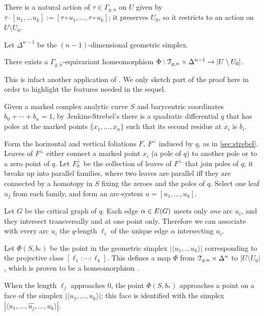 There is a natural action of $\tau \in \Gamma_{g,n}$ on $U$ given by $\tau \cdot [u_1, \ldots
u_k] := [\tau \circ u_1, \ldots, \tau \circ u_k]$; it preserves $U_0$, so it restricts to
an action on $U \setminus U_0$.

Let $\Delta^{n-1}$ be the $(n-1)$-dimensional geometric simplex.
\begin{theorem}
  \label{thm:H}
  There exists a $\Gamma_{g,n}$-equivariant homeomorphism $\Phi: \mathcal{T}_{g,n} \times
  \Delta^{n-1} \to |U \setminus U_0|$.
\end{theorem}
This is infact another application of .  We only sketch
part of the proof here in order to highlight the features needed in the
sequel. 

Given a marked complex analytic curve $S$ and barycentric coordinates
$b_0 + \cdots + b_n = 1$, by Jenkins-Strebel's  there is a
quadratic differential $q$ that has poles at the marked points $\{ x_1,
\ldots, x_n \}$ such that its second residue at $x_i$ is $b_i$.

Form the horizontal and vertical foliations $F$, $F^\perp$ induced by $q$,
as in \ref{sec:strebel}.  Leaves of $F^\perp$ either connect a marked
point $x_i$ (a pole of $q$) to another pole or to a zero point of $q$.
Let $F^\perp_0$ be the collection of leaves of $F^\perp$ that join poles of
$q$; it breaks up into parallel families, where two leaves are
parallel iff they are connected by a homotopy in $S$ fixing the zeroes
and the poles of $q$.  Select one leaf $u_j$ from each family, and
form an arc-system $u = [u_1, \ldots, u_k]$.

Let $G$ be the critical graph of $q$.  Each edge $\alpha \in E(G)$ meets
only \emph{one} arc $u_i$, and they intersect transversally and at one
point only.  Therefore we can associate with every arc $u_i$ the
$q$-length $\ell_i$ of the unique edge $\alpha$ intersecting $u_i$.  

Let $\Phi(S, b_*)$ be the point in the geometric simplex $|\langle u_1, \ldots
u_k\rangle|$ corresponding to the projective class $[\ell_1:\cdots:\ell_k]$.  This
defines a map $\Phi$ from $\mathcal{T}_{g,n} \times \Delta^n$ to $|U \setminus U_0|$, which is
proven to be a homeomorphism \cite{harer;cohomological-dimension,
  looijenga;cellular-decomposition}.

\begin{remark}
  \label{rem:approaching-face}
  When the length $\ell_j$ approaches $0$, the point $\Phi(S, b_*)$
  approaches a point on a face of the simplex $|\langle u_1, \ldots, u_k\rangle|$; this
  face is identified with the simplex $|\langle u_1, \ldots, \hat{u_j}, \ldots, u_k\rangle|$.
\end{remark}


